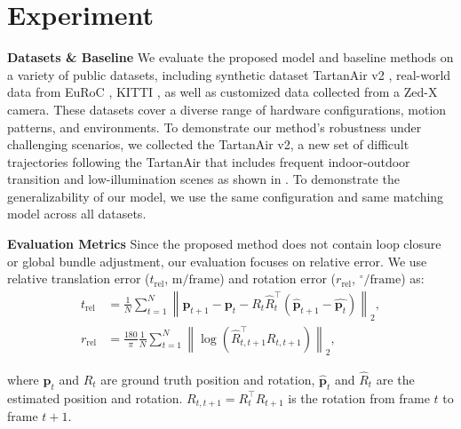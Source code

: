 \section{Experiment}

\textbf{Datasets \& Baseline}\; We evaluate the proposed model and baseline methods on a variety of public datasets, including synthetic dataset TartanAir v2 \cite{tartanair2020iros}, real-world data from EuRoC \cite{euroc2016}, KITTI \cite{kitti2012}, as well as customized data collected from a Zed-X
camera. 
These datasets cover a diverse range of hardware configurations, motion patterns, and environments. 
To demonstrate our method's robustness under challenging scenarios, we collected the TartanAir v2, a new set of difficult trajectories following the TartanAir \cite{tartanair2020iros} that includes frequent indoor-outdoor transition and low-illumination scenes as shown in . 
To demonstrate the generalizability of our model, we use the same configuration and same matching model across all datasets.


\textbf{Evaluation Metrics}\; Since the proposed method does not contain loop closure or global bundle adjustment, our evaluation focuses on relative error.
We use relative translation error ($t_{\mathrm{rel}}$, $\mathrm{m/frame}$) and rotation error ($r_{\mathrm{rel}}$, $\mathrm{{}^\circ/frame}$) as:
\begin{equation}
\begin{aligned}        
    t_{\mathrm{rel}} &= \frac{1}{N}\sum^N_{t=1}{\left\| \mathbf{p}_{t+1} - \mathbf{p}_{t} - R_{t}\hat{R}_{t}^\top\!\!\left(\hat{\mathbf{p}}_{t+1} - \hat{\mathbf{p}_{t}}\right)\right\|_2},\\
    r_{\mathrm{rel}} &= \frac{180}{\pi}\frac{1}{N} \sum^N_{t=1}\left\| \log\left( \hat{R}_{t,t+1}^\top  R_{t,t+1}\right)\right\|_2, 
\end{aligned}
\end{equation}


where $\mathbf{p}_t$ and $R_t$ are ground truth position and rotation, $\hat{\mathbf{p}}_t$ and $\hat{R}_t$ are the estimated position and rotation. $R_{t,t+1}= R_{t}^\top R_{t+1}$ is the rotation from frame $t$ to frame $t+1$.

